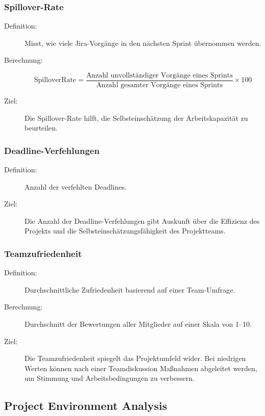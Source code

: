 \documentclass{article}
\begin{document}
\subsubsection{Spillover-Rate}
\begin{description}
  \item[Definition:] Misst, wie viele Jira-Vorgänge in den nächsten Sprint übernommen werden.
  
  \item[Berechnung:] 
  \[
    \text{SpilloverRate} = 
    \frac{\text{Anzahl unvollständiger Vorgänge eines Sprints}}
         {\text{Anzahl gesamter Vorgänge eines Sprints}} 
    \times 100
  \]
  
  \item[Ziel:] Die Spillover-Rate hilft, die Selbsteinschätzung der Arbeitskapazität zu beurteilen.
\end{description}


\subsubsection{Deadline-Verfehlungen}
\begin{description}
  \item[Definition:] Anzahl der verfehlten Deadlines.
  \item[Ziel:] Die Anzahl der Deadline-Verfehlungen gibt Auskunft über die Effizienz des Projekts und die Selbsteinschätzungsfähigkeit des Projektteams.
\end{description}

\subsubsection{Teamzufriedenheit}
\begin{description}
  \item[Definition:] Durchschnittliche Zufriedenheit basierend auf einer Team-Umfrage.
  \item[Berechnung:] Durchschnitt der Bewertungen aller Mitglieder auf einer Skala von 1--10.
  \item[Ziel:] Die Teamzufriedenheit spiegelt das Projektumfeld wider. Bei niedrigen Werten können nach einer Teamdiskussion Maßnahmen abgeleitet werden, um Stimmung und Arbeitsbedingungen zu verbessern.
\end{description}



\subsection{Project Environment Analysis}
\end{document}
